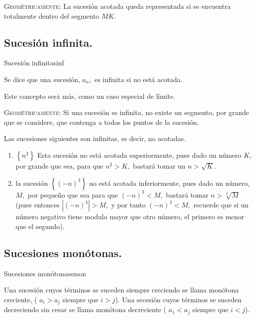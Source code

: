 \documentclass[oneside,english,spanish,2m,twoside,svgnames,x11names,HTML,twoside,12pt]{libro-matua}\usepackage[]{graphicx}\usepackage[]{color}
\newcommand{\noun}[1]{\textsc{#1}}
\begin{document}
\noun{Geométricamente}: La sucesión acotada queda representada si
se encuentra totalmente dentro del segmento $MK.$

\subsection{Sucesión infinita.}

\begin{defi}{Sucesión infinita}{sinf}

Se dice que una sucesión, $a_{n},$ es infinita si no está acotada. 

\end{defi}

Este concepto será más, como un caso especial de límite.

\noun{Geométricamente}: Si una sucesión es infinita, no existe un
segmento, por grande que se considere, que contenga a todos los puntos
de la sucesión. 

\begin{ejemplos}

Las sucesiones siguientes son infinitas, es decir, no acotadas.
\begin{enumerate}
\item $\left\{ n^{2}\right\} $ Esta sucesión no está acotada superiormente,
pues dado un número $K$, por grande que sea, para que $n^{2}>K,$
bastará tomar un $n>\sqrt{K}.$
\item la sucesión $\left\{ \left(-n\right)^{3}\right\} $ no está acotada
inferiormente, pues dado un número, $M,$ por pequeño que sea para
que $\left(-n\right)^{3}<M,$ bastará tomar $n>\sqrt[3]{M}$ (pues
entonces $\left|\left(-n\right)^{3}\right|>M,$ y por tanto $\left(-n\right)^{3}<M,$
recuerde que si un número negativo tiene modulo mayor que otro número,
el primero es menor que el segundo). 
\end{enumerate}
\end{ejemplos}

\subsection{Sucesiones monótonas.}

\begin{defi}{Sucesiones monótonas}{smon}

Una sucesión cuyos términos se suceden siempre creciendo se llama
monótona creciente, ( $a_{i}>a_{j}$ siempre que $i>j$). Una secesión
cuyos términos se suceden decreciendo sin cesar se llama monótona
decreciente ( $a_{1}<a_{j}$ siempre que $i<j$). 

\end{defi}
\end{document}
